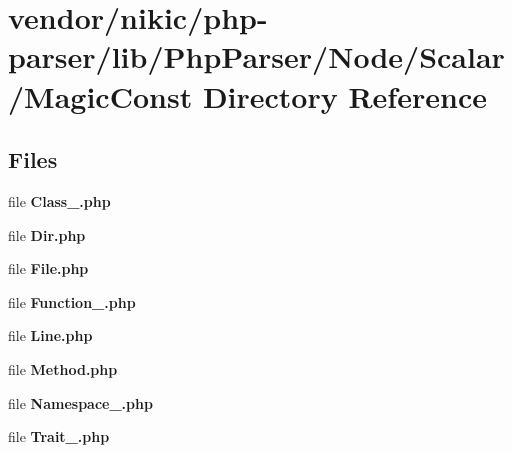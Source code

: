 \section{vendor/nikic/php-\/parser/lib/\+Php\+Parser/\+Node/\+Scalar/\+Magic\+Const Directory Reference}
\label{dir_4f805bb7ca41814d0d47a18b59d3dfbe}
\subsection*{Files}
\begin{DoxyCompactItemize}
\item 
file {\bf Class\+\_\+.\+php}
\item 
file {\bf Dir.\+php}
\item 
file {\bf File.\+php}
\item 
file {\bf Function\+\_\+.\+php}
\item 
file {\bf Line.\+php}
\item 
file {\bf Method.\+php}
\item 
file {\bf Namespace\+\_\+.\+php}
\item 
file {\bf Trait\+\_\+.\+php}
\end{DoxyCompactItemize}
